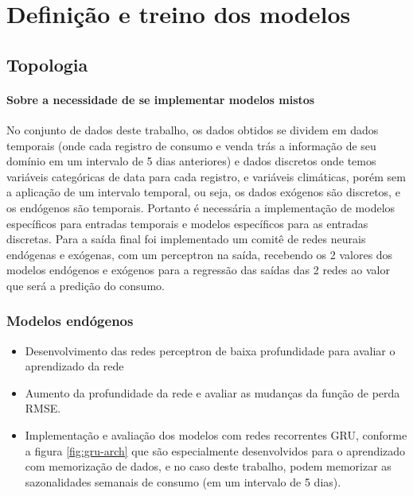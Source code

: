     \section{Definição e treino dos modelos}
        \subsection{Topologia}
            \paragraph*{Sobre a necessidade de se implementar modelos mistos}
                No conjunto de dados deste trabalho, os dados obtidos se dividem em dados temporais (onde cada registro de consumo e venda trás a informação de seu domínio em um intervalo de 5 dias anteriores) e dados discretos onde temos variáveis categóricas de data para cada registro, e variáveis climáticas, porém sem a aplicação de um intervalo temporal, ou seja, os dados exógenos são discretos, e os endógenos são temporais.
                Portanto é necessária a implementação de modelos específicos para entradas temporais e modelos específicos para as entradas discretas.
                Para a saída final foi implementado um comitê de redes neurais endógenas e exógenas, com um perceptron na saída, recebendo os 2 valores dos modelos endógenos e exógenos para a regressão das saídas das 2 redes ao valor que será a predição do consumo.
         	\subsubsection{Modelos endógenos}
         	\begin{itemize}
                \item	Desenvolvimento das redes perceptron de baixa profundidade para avaliar o aprendizado da rede
                \item	Aumento da profundidade da rede e avaliar as mudanças da função de perda RMSE. 
                \item	Implementação e avaliação dos modelos com redes recorrentes GRU, conforme a figura \ref{fig:gru-arch} que são especialmente desenvolvidos para o aprendizado com memorização de dados, e no caso deste trabalho, podem memorizar as sazonalidades semanais de consumo (em um intervalo de 5 dias).
            \end{itemize}
